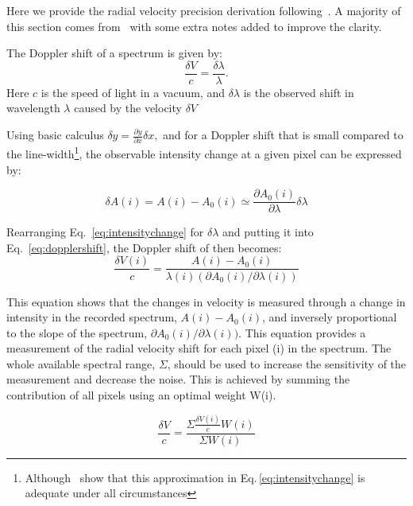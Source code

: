 Here we provide the radial velocity precision derivation following~\citet{Connes1985, bouchy_fundamental_2001, figueira_radial_2016}. A majority of this section comes from~\citet{bouchy_fundamental_2001} with some extra notes added to improve the clarity.

The Doppler shift of a spectrum is given by:
\begin{equation}
\frac{\delta V}{c} = \frac{\delta \lambda}{\lambda}.
\label{eq:dopplershift}
\end{equation}
Here $c$ is the speed of light in a vacuum, and $\delta \lambda$ is the observed shift in wavelength $\lambda$ caused by the velocity $\delta V$

Using basic calculus \(\delta y = \frac{\partial y}{\partial x} \delta x,  \nonumber\) and for a Doppler shift that is small compared to the line-width\footnote{Although~\citet{Connes1985} show that this approximation in Eq.\,\ref{eq:intensitychange} is adequate under all circumstances}, the observable intensity change at a given pixel can be expressed by:

\begin{equation}
\delta A(i) = A(i) - A_0(i) \simeq \frac{\partial A_0(i)}{\partial \lambda} \delta \lambda
\label{eq:intensitychange}
\end{equation}

Rearranging Eq.~\ref{eq:intensitychange} for \(\delta \lambda\) and putting it into Eq.~\ref{eq:dopplershift}, the Doppler shift of then becomes:
\begin{equation}
    \frac{\delta V(i)}{c} = \frac{A(i) - A_0(i) }{\lambda(i) (\partial A_0(i)/\partial \lambda(i))} \label{eq:delta_v_i}
\end{equation}

This equation shows that the changes in velocity is measured through a change in intensity in the recorded spectrum, \(A(i)-A_0(i)\), and inversely proportional to the slope of the spectrum, \(\partial A_0(i)/\partial \lambda(i))\). 
This equation provides a measurement of the radial velocity shift for each pixel (i) in the spectrum. The whole available spectral range, $\Sigma$, should be used to increase the sensitivity of the measurement and decrease the noise. This is achieved by summing the contribution of all pixels using an optimal weight W(i).

\begin{equation}
\frac{\delta V}{c} = \frac{\Sigma{ \frac{\delta V(i)}{c}W(i)}}{\Sigma {W(i)}}
\end{equation}

